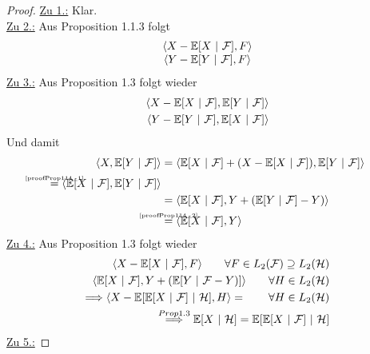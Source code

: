 \begin{proof}
\underline{Zu 1.:} Klar.\\

\underline{Zu 2.:} Aus Proposition 1.1.3 folgt
\begin{align*}
\begin{matrix}
\langle X-\mathbb{E}[X~|~\mathcal{F}],F\rangle\\
\langle Y-\mathbb{E}[Y~|~\mathcal{F}],F\rangle
\end{matrix}
\end{align*}
\underline{Zu 3.:} Aus Proposition 1.3 folgt wieder
\begin{align}
\langle X-\mathbb{E}[X~|~\mathcal{F}],\mathbb{E}[Y~|~\mathcal{F}]\rangle\label{proofProp114_1}\\
\langle Y-\mathbb{E}[Y~|~\mathcal{F}],\mathbb{E}[X~|~\mathcal{F}]\rangle\label{proofProp114_2}
\end{align}
Und damit
\begin{align*}
\langle X,\E[Y~|~\mathcal{F}]\rangle
&=\langle \E[X~|~\mathcal{F}]+(X-\E[X~|~\mathcal{F}]),\E[Y~|~\mathcal{F}]\rangle\\
\stackeq{\ref{proofProp114_1}}
\langle\E[X~|~\mathcal{F}],\E[Y~|~\mathcal{F}]\rangle\\
&=\langle\E[X~|~\mathcal{F}],Y+(\E[Y~|~\mathcal{F}]-Y)\rangle\\
&\stackeq{\ref{proofProp114_2}}
\langle\E[X~|~\mathcal{F}],Y\rangle
\end{align*}
\underline{Zu 4.:} 
Aus Proposition 1.3 folgt wieder
\begin{align}
\langle X-\mathbb{E}[X~|~\mathcal{F}],F\rangle\qquad\forall F\in L_2(\mathcal{F})\supseteq L_2(\mathcal{H})\\
\langle \mathbb{E}[X~|~\mathcal{F}],Y+(\mathbb{E}[Y~|~\mathcal{F}-Y)]\rangle\qquad\forall H\in L_2(\mathcal{H})\\
\Longrightarrow\langle X-\mathbb{E}[\mathbb{E}[X~|~\mathcal{F}]~|~\mathcal{H}],H\rangle=\qquad\forall H\in L_2(\mathcal{H})\\
\stackrel{Prop 1.3}{\Longrightarrow}\mathbb{E}[X~|~\mathcal{H}]=\mathbb{E}[\mathbb{E}[X~|~\mathcal{F}]~|~\mathcal{H}]
\end{align}
\underline{Zu 5.:} 

\end{proof}
